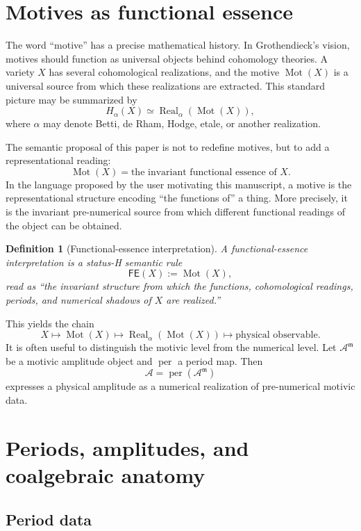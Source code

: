 \documentclass[11pt]{article}
\newtheorem{definition}{Definition}[section]
\newcommand{\Real}{\operatorname{Real}}
\newcommand{\Mot}{\operatorname{Mot}}
\newcommand{\per}{\operatorname{per}}
\newcommand{\Sheur}{\textsf{H}}
\begin{document}
\section{Motives as functional essence}

The word ``motive'' has a precise mathematical history. In Grothendieck's vision, motives should function as universal objects behind cohomology theories. A variety $X$ has several cohomological realizations, and the motive $\Mot(X)$ is a universal source from which these realizations are extracted. This standard picture may be summarized by
\[
H_\alpha(X)\simeq \Real_\alpha(\Mot(X)),
\]
where $\alpha$ may denote Betti, de Rham, Hodge, etale, or another realization.

The semantic proposal of this paper is not to redefine motives, but to add a representational reading:
\[
\boxed{\Mot(X)=\text{the invariant functional essence of }X.}
\]
In the language proposed by the user motivating this manuscript, a motive is the representational structure encoding ``the functions of'' a thing. More precisely, it is the invariant pre-numerical source from which different functional readings of the object can be obtained.

\begin{definition}[Functional-essence interpretation]
A \emph{functional-essence interpretation} is a status-\Sheur{} semantic rule
\[
\mathsf{FE}(X):=\Mot(X),
\]
read as ``the invariant structure from which the functions, cohomological readings, periods, and numerical shadows of $X$ are realized.''
\end{definition}

This yields the chain
\[
\boxed{
X\longmapsto \Mot(X)\longmapsto \Real_\alpha(\Mot(X))\longmapsto \text{physical observable}.
}
\]
It is often useful to distinguish the motivic level from the numerical level. Let $\mathcal A^{\mathfrak m}$ be a motivic amplitude object and $\per$ a period map. Then
\[
\boxed{\mathcal A=\per(\mathcal A^{\mathfrak m})}
\]
expresses a physical amplitude as a numerical realization of pre-numerical motivic data.

\section{Periods, amplitudes, and coalgebraic anatomy}

\subsection{Period data}
\end{document}
